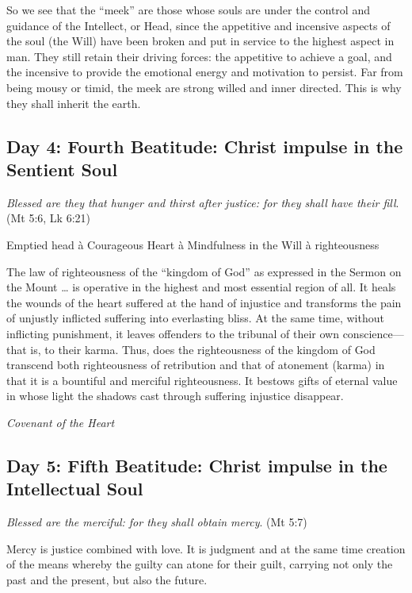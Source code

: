So we see that the “meek” are those whose souls are under the control and guidance of the Intellect, or Head, since the
appetitive and incensive aspects of the soul (the Will) have been broken and put in service to the highest aspect in
man. They still retain their driving forces: the appetitive to achieve a goal, and the incensive to provide the
emotional energy and motivation to persist. Far from being mousy or timid, the meek are strong willed and inner
directed. This is why they shall inherit the earth.

\subsection*{Day 4: Fourth Beatitude: Christ impulse in the Sentient Soul}
\emph{Blessed are they that hunger and thirst after justice: for they shall have their fill}. (Mt 5:6, Lk 6:21)

Emptied head à Courageous Heart à Mindfulness in the Will à righteousness

\begin{quotationx}
The law of righteousness of the “kingdom of God” as expressed in the Sermon on the Mount … is operative in the highest
and most essential region of all. It heals the wounds of the heart suffered at the hand of injustice and transforms the
pain of unjustly inflicted suffering into everlasting bliss. At the same time, without inflicting punishment, it leaves
offenders to the tribunal of their own conscience—that is, to their karma. Thus, does the
righteousness of the kingdom of God transcend both righteousness of retribution and that of atonement (karma) in that
it is a bountiful and merciful righteousness. It bestows gifts of eternal value in whose light the shadows cast through
suffering injustice disappear. 
\begin{flushright}\textit{Covenant of the Heart}\end{flushright}

\end{quotationx}
\subsection*{Day 5: Fifth Beatitude: Christ impulse in the Intellectual Soul}
\emph{Blessed are the merciful: for they shall obtain mercy}. (Mt 5:7)

Mercy is justice combined with love. It is judgment and at the same time creation of the means whereby the guilty can
atone for their guilt, carrying not only the past and the present, but also the future.

